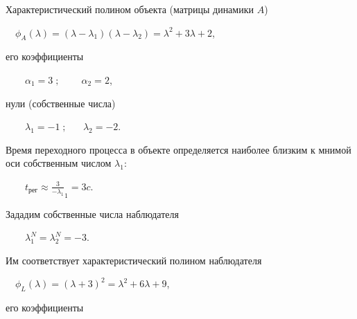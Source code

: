 \documentclass[a4paper]{article}
\begin{document}
{\begin{russian}\sffamily
Характеристический полином объекта (матрицы динамики  $A$)
\end{russian}}

{\begin{russian}\sffamily
\ \  $ϕ_A(λ)=(λ-λ_1)(λ-λ_2)=λ^2+3λ+2$,
\end{russian}}

{\begin{russian}\sffamily
его коэффициенты
\end{russian}}

{\begin{russian}\sffamily
\ \ \ \  $α_1=3\;;\;\;\;\;\;\;\;\;α_2=2$,
\end{russian}}

{\begin{russian}\sffamily
нули (собственные числа)
\end{russian}}

{\begin{russian}\sffamily
\ \ \ \  $λ_1=-1\;;\;\;\;\;\;\;λ_2=-2$.
\end{russian}}

{\begin{russian}\sffamily
Время переходного процесса в объекте определяется наиболее близким к мнимой оси собственным числом  $λ_1$:
\end{russian}}

{\begin{russian}\sffamily
\ \ \ \  $t_{\text{рег}}\approx \frac 3{-λ_1}_1=3c$.
\end{russian}}

{\begin{russian}\sffamily
Зададим собственные числа наблюдателя
\end{russian}}

{\begin{russian}\sffamily
\ \ \ \  $λ_1^N=λ_2^N=-3$.
\end{russian}}

{\begin{russian}\sffamily
Им соответствует характеристический полином наблюдателя
\end{russian}}

{\begin{russian}\sffamily
\ \  $ϕ_L(λ)=(λ+3)^2=λ^2+6λ+9$,
\end{russian}}

{\begin{russian}\sffamily
его коэффициенты
\end{russian}}
\end{document}
